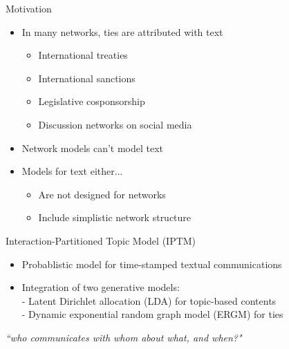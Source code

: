 \documentclass[10pt]{beamer}
\def\bni{\begin{itemize}} \def\ei{\end{itemize}}
\theoremstyle{definition}
\theoremstyle{remark}
\begin{document}
\begin{frame}{Motivation}
\Large
\begin{itemize}
\item In many networks, ties are attributed with text
\begin{itemize}
\item International treaties
\item International sanctions
\item Legislative cosponsorship
\item Discussion networks on social media
\end{itemize}
\vspace{.2cm}
\item Network models can't model text
\vspace{.3cm}
\item Models for text either...
\begin{itemize}
\item Are not designed for networks
\item Include simplistic network structure
\end{itemize}
\end{itemize}
\end{frame}

\begin{frame}{Interaction-Partitioned Topic Model (IPTM)}
\large
	\bni
	\item Probablistic model for time-stamped textual communications \\
	\vspace{0.2cm}
	\item Integration of two generative models:\\
		\vspace{0.1cm}
	 - Latent Dirichlet allocation (LDA) for topic-based contents\\	\vspace{0.2cm}
	 - Dynamic exponential random graph model (ERGM) for ties \\
	\ei
		\vspace{0.4cm}
\centering \large\textit{``who communicates with whom about what, and when?"}
\end{frame}
\end{document}
